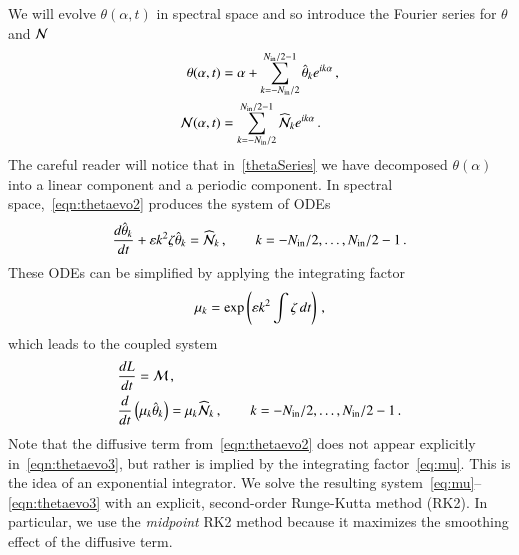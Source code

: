 \documentclass[preprint, 10pt]{elsarticle}
\begin{document}
We will evolve $\theta(\alpha,t)$ in spectral space and so introduce the Fourier series for $\theta$ and $\mathcal{N}$
\begin{align}
\label{thetaSeries}
 \theta(\alpha,t) &= \alpha + \FourierSum \thhat_k e^{ i k \alpha} \, , \\
 \NLterm(\alpha,t)  &= \FourierSum \widehat{\NLterm}_k e^{ i k \alpha} \, .
\end{align}
The careful reader will notice that in~\eqref{thetaSeries} we have decomposed $\theta(\alpha)$ into a linear component and a periodic component. In spectral space,~\eqref{eqn:thetaevo2} produces the system of ODEs
\begin{align}
\tderiv{\thhat_k}{t} +  \eps k^2  \elfun \thhat_k =
\widehat{\NLterm}_k\, ,
\qquad k=-N_\iin/2,\ldots,N_\iin/2-1\, .
\end{align}
These ODEs can be simplified by applying the integrating factor
\begin{align}
\label{eq:mu}
\mu_k = \exp \left( \varepsilon k^2 \int \zeta \, dt \right) \, ,
\end{align}
which leads to the coupled system
\begin{align}
\label{eqn:Levo3}
& \tderiv{L}{t} = \Mterm \, , \\
\label{eqn:thetaevo3}
& \tderiv{}{t}\left( \mu_k \thhat_k \right) = \mu_k \widehat{\NLterm}_k \, ,
\qquad k = -N_\iin/2, \ldots, N_\iin/2 -1 \, .
\end{align}
Note that the diffusive term from~\eqref{eqn:thetaevo2} does not appear explicitly in~\eqref{eqn:thetaevo3}, but rather is implied by the integrating factor~\eqref{eq:mu}. This is the idea of an exponential integrator. We solve the resulting system~\eqref{eq:mu}--\eqref{eqn:thetaevo3} with an
explicit, second-order Runge-Kutta method (RK2). In particular, we use the {\em midpoint} RK2 method because it maximizes the smoothing effect of the diffusive term.
\end{document}
